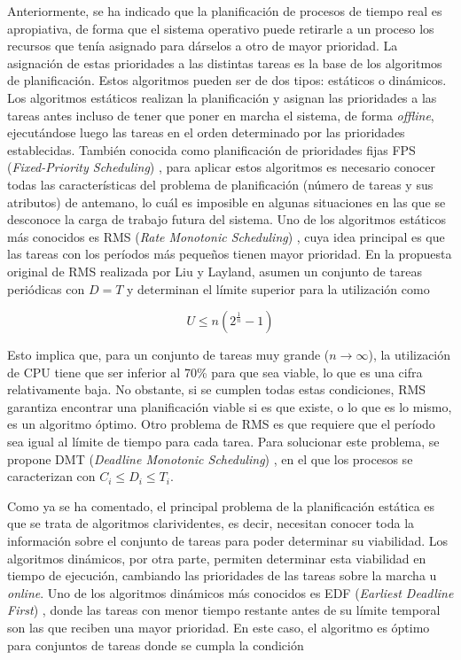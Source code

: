 Anteriormente, se ha indicado que la planificación de procesos de tiempo real es
apropiativa, de forma que el sistema operativo puede retirarle a un proceso los
recursos que tenía asignado para dárselos a otro de mayor prioridad. La
asignación de estas prioridades a las distintas tareas es la base de los
algoritmos de planificación. Estos algoritmos pueden ser de dos tipos: estáticos
o dinámicos. Los algoritmos estáticos realizan la planificación y asignan las
prioridades a las tareas antes incluso de tener que poner en marcha el sistema,
de forma \textit{offline}, ejecutándose luego las tareas en el orden determinado
por las prioridades establecidas. También conocida como planificación de
prioridades fijas FPS (\textit{Fixed-Priority Scheduling})
\cite{tilborg_fixed_1991}, para aplicar estos algoritmos es necesario conocer
todas las características del problema de planificación (número de tareas y sus
atributos) de antemano, lo cuál es imposible en algunas situaciones en las que
se desconoce la carga de trabajo futura del sistema. Uno de los algoritmos
estáticos más conocidos es RMS (\textit{Rate Monotonic Scheduling})
\cite{liu_scheduling_1973}\cite{kao_rate-monotonic_2008}, cuya idea principal es
que las tareas con los períodos más pequeños tienen mayor prioridad. En la
propuesta original de RMS realizada por Liu y Layland, asumen un conjunto de
tareas periódicas con $D=T$ y determinan el límite superior para la utilización
como

\begin{equation}
  U \leq n(2^{\frac{1}{n}} - 1)
\end{equation}

Esto implica que, para un conjunto de tareas muy grande ($n \rightarrow
  \infty$), la utilización de CPU tiene que ser inferior al 70\% para que sea
viable, lo que es una cifra relativamente baja. No obstante, si se cumplen todas
estas condiciones, RMS garantiza encontrar una planificación viable si es que
existe, o lo que es lo mismo, es un algoritmo óptimo. Otro problema de RMS es
que requiere que el período sea igual al límite de tiempo para cada tarea. Para
solucionar este problema, se propone DMT (\textit{Deadline Monotonic
  Scheduling}) \cite{audsley_hard_1991}, en el que los procesos se caracterizan
con $C_{i} \leq D_{i} \leq T_{i}$.

Como ya se ha comentado, el principal problema de la planificación estática es
que se trata de algoritmos clarividentes, es decir, necesitan conocer toda la
información sobre el conjunto de tareas para poder determinar su viabilidad. Los
algoritmos dinámicos, por otra parte, permiten determinar esta viabilidad
en tiempo de ejecución, cambiando las prioridades de las tareas sobre la marcha
u \textit{online}. Uno de los algoritmos dinámicos más conocidos es EDF
(\textit{Earliest Deadline First}) \cite{liu_scheduling_1973}, donde las tareas
con menor tiempo restante antes de su límite temporal son las que reciben una
mayor prioridad. En este caso, el algoritmo es óptimo para conjuntos de tareas
donde se cumpla la condición \cite{zhang_schedulability_2009}


